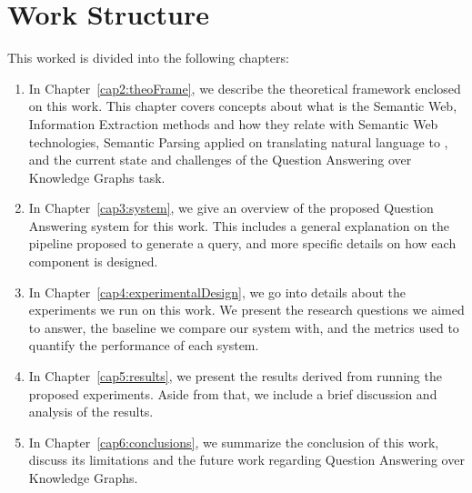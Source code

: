 \section{Work Structure}
This worked is divided into the following chapters:

\begin{enumerate}
    \item In Chapter~\ref{cap2:theoFrame}, we describe the theoretical framework 
    enclosed on this work. This chapter covers concepts about what is the Semantic 
    Web, Information Extraction methods and how they relate with Semantic Web 
    technologies, Semantic Parsing applied on translating natural language to 
    \SPARQL, and the current state and challenges of the Question Answering over 
    Knowledge Graphs task.
    \item In Chapter~\ref{cap3:system}, we give an overview of the proposed Question 
    Answering system for this work. This includes a general explanation on the 
    pipeline proposed to generate a \SPARQL{} query, and more specific details on how 
    each component is designed.    
    \item In Chapter~\ref{cap4:experimentalDesign}, we go into details about the 
    experiments we run on this work. We present the research questions we aimed to answer, 
    the baseline we compare our system with, and the metrics used to quantify the 
    performance of each system.    
    \item In Chapter~\ref{cap5:results}, we present the results derived from running the 
    proposed experiments. Aside from that, we include a brief discussion and analysis of 
    the results.    
    \item In Chapter~\ref{cap6:conclusions}, we summarize the conclusion of this work, 
    discuss its limitations and the future work regarding Question Answering over 
    Knowledge Graphs.
    
\end{enumerate}
